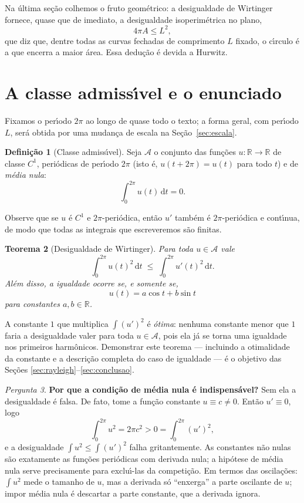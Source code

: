 \documentclass[11pt,a4paper]{amsart}
\newcommand{\R}{\mathbb{R}}
\renewcommand{\d}{\mathrm{d}}
\newcommand{\Adm}{\mathcal{A}}
\theoremstyle{plain}
\newtheorem{teorema}{Teorema}[section]
\theoremstyle{definition}
\newtheorem{definicao}[teorema]{Definição}
\theoremstyle{remark}
\newtheorem{pergunta}[teorema]{Pergunta}
\begin{document}
Na \'ultima se\c{c}\~ao colhemos o fruto geom\'etrico: a desigualdade de
Wirtinger fornece, quase que de imediato, a desigualdade isoperim\'etrica no
plano,
\[
  4\pi A \le L^2 ,
\]
que diz que, dentre todas as curvas fechadas de comprimento $L$ fixado, o
c\'\i rculo \'e a que encerra a maior \'area. Essa dedu\c{c}\~ao \'e devida a
Hurwitz.

\section{A classe admiss\'\i vel e o enunciado}

Fixamos o per\'\i odo $2\pi$ ao longo de quase todo o texto; a forma geral, com
per\'\i odo $L$, ser\'a obtida por uma mudan\c{c}a de escala na
Se\c{c}\~ao~\ref{sec:escala}.

\begin{definicao}[Classe admiss\'\i vel]\label{def:adm}
Seja $\Adm$ o conjunto das fun\c{c}\~oes $u\colon\R\to\R$ de classe $C^1$,
peri\'odicas de per\'\i odo $2\pi$ (isto \'e, $u(t+2\pi)=u(t)$ para todo $t$) e
de \emph{m\'edia nula}:
\[
  \int_0^{2\pi} u(t)\,\d t = 0 .
\]
\end{definicao}

Observe que se $u$ \'e $C^1$ e $2\pi$-peri\'odica, ent\~ao $u'$ tamb\'em \'e
$2\pi$-peri\'odica e cont\'\i nua, de modo que todas as integrais que
escreveremos s\~ao finitas.

\begin{teorema}[Desigualdade de Wirtinger]\label{thm:wirtinger}
Para toda $u\in\Adm$ vale
\[
  \int_0^{2\pi} u(t)^2 \,\d t \;\le\; \int_0^{2\pi} u'(t)^2 \,\d t .
\]
Al\'em disso, a igualdade ocorre \emph{se, e somente se,}
\[
  u(t) = a\cos t + b\sin t
\]
para constantes $a,b\in\R$.
\end{teorema}

A constante $1$ que multiplica $\int (u')^2$ \'e \emph{\'otima}: nenhuma
constante menor que $1$ faria a desigualdade valer para toda $u\in\Adm$, pois
ela j\'a se torna uma igualdade nos primeiros harm\^onicos. Demonstrar este
teorema --- incluindo a otimalidade da constante e a descri\c{c}\~ao completa
do caso de igualdade --- \'e o objetivo das Se\c{c}\~oes
\ref{sec:rayleigh}--\ref{sec:conclusao}.

\begin{pergunta}\label{perg:media}
\textbf{Por que a condi\c{c}\~ao de m\'edia nula \'e indispens\'avel?}
Sem ela a desigualdade \'e falsa. De fato, tome a fun\c{c}\~ao constante
$u\equiv c\neq 0$. Ent\~ao $u'\equiv 0$, logo
\[
  \int_0^{2\pi} u^2 = 2\pi c^2 > 0 = \int_0^{2\pi}(u')^2 ,
\]
e a desigualdade $\int u^2\le\int (u')^2$ falha gritantemente. As constantes
n\~ao nulas s\~ao exatamente as fun\c{c}\~oes peri\'odicas com derivada nula;
a hip\'otese de m\'edia nula serve precisamente para exclu\'\i-las da
competi\c{c}\~ao. Em termos das oscila\c{c}\~oes: $\int u^2$ mede o tamanho de
$u$, mas a derivada s\'o ``enxerga'' a parte oscilante de $u$; impor m\'edia
nula \'e descartar a parte constante, que a derivada ignora.
\end{pergunta}
\end{document}
